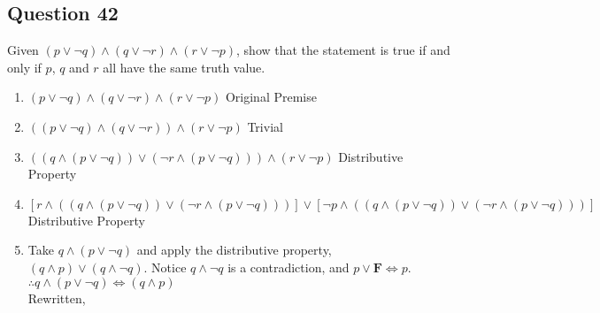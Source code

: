 \documentclass[12pt]{article}
\begin{document}
\subsection*{Question 42}
Given $(p \lor \neg q) \land (q \lor \neg r) \land (r \lor \neg p)$, show that
the statement is true if and only if $p$, $q$ and $r$ all have the same truth
value.

\begin{enumerate}
  \item $(p \lor \neg q) \land (q \lor \neg r) \land (r \lor \neg p)$ \quad Original Premise
  \item $((p \lor \neg q) \land (q \lor \neg r)) \land (r \lor \neg p)$ \quad Trivial
  \item $((q \land (p \lor \neg q)) \lor (\neg r \land (p \lor \neg q)))
    \land (r \lor \neg p)$ \quad Distributive Property
  \item 
    $[r \land ((q \land (p \lor \neg q)) \lor (\neg r \land (p \lor \neg q)))] \lor 
    [\neg p \land ((q \land (p \lor \neg q)) \lor (\neg r \land (p \lor \neg q)))]$
    \quad Distributive Property
  \item Take $q \land (p \lor \neg q)$ and apply the distributive property, \\
    $(q \land p) \lor (q \land \neg q)$. Notice $q \land \neg q$ is a
    contradiction, and $p \lor \mathbf{F} \Leftrightarrow p$. \\
    $\therefore q \land (p \lor \neg q) \Leftrightarrow (q \land p)$ \\
    Rewritten,


\end{enumerate}
\end{document}

